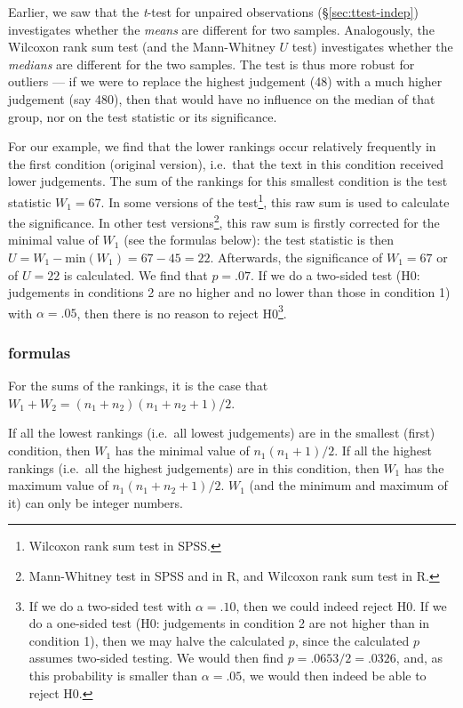 \documentclass[
]{book}
\begin{document}
Earlier, we saw that the \emph{t}-test for unpaired observations
(§\ref{sec:ttest-indep}) investigates whether the \emph{means}
are different for two samples. Analogously, the Wilcoxon
rank sum test (and the Mann-Whitney \(U\) test) investigates whether the
\emph{medians} are different for the two samples. The test is thus more
robust for outliers --- if we were to replace the highest judgement (48)
with a much higher judgement (say 480), then that would have no influence
on the median of that group, nor on the test statistic or its
significance.

For our example, we find that the lower rankings occur relatively frequently
in the first condition (original version), i.e.~that the text in this condition
received lower judgements. The sum of the rankings for this
smallest condition is the test statistic \(W_1=67\). In some versions of the
test\footnote{Wilcoxon rank sum test in SPSS.}, this raw sum is used to calculate the significance.
In other test versions\footnote{Mann-Whitney test in SPSS and in R, and Wilcoxon rank sum test in R.}, this raw sum is firstly corrected for the
minimal value of \(W_1\) (see the formulas below): the test statistic
is then \(U=W_1 - \textrm{min}(W_1) = 67-45=22\). Afterwards, the significance
of \(W_1=67\) or of \(U=22\) is calculated. We find that \(p=.07\). If we do a
two-sided test (H0: judgements in conditions 2 are no higher and no lower
than those in condition 1) with \(\alpha=.05\), then there is no reason to
reject H0\footnote{If we do a two-sided test with \(\alpha=.10\), then we could indeed
  reject H0. If we do a one-sided test (H0: judgements in condition 2 are not higher
  than in condition 1), then we may halve the calculated \(p\), since the calculated
  \(p\) assumes two-sided testing. We would then find \(p=.0653/2=.0326\), and,
  as this probability is smaller than \(\alpha=.05\), we would then indeed
  be able to reject H0.}.

\subsubsection{formulas}\label{formulas-8}

For the sums of the rankings, it is the case that
\(W_1 + W_2 = (n_1+n_2) (n_1+n_2+1) / 2\).

If all the lowest rankings (i.e.~all lowest judgements) are in the smallest (first) condition,
then \(W_1\) has the minimal value of
\(n_1 (n_1+1) /2\).
If all the highest rankings (i.e.~all the highest judgements) are in this condition,
then \(W_1\) has the maximum value of
\(n_1 (n_1+n_2+1) / 2\).
\(W_1\) (and the minimum and maximum of it) can only be integer numbers.
\end{document}
